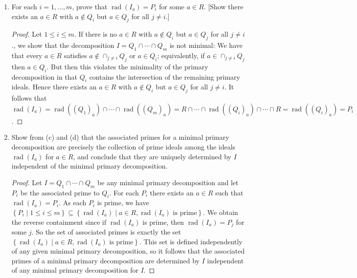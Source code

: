 \documentclass[11pt]{article}
\newcommand{\cbr}[1]{\left\{#1\right\}}
\DeclareMathOperator{\rad}{rad}
\begin{document}
\begin{enumerate}
\begin{enumerate}
\begin{proof}
        \end{proof}
        \item For each $i=1,\dots,m$, prove that $\rad(I_a)=P_i$ for some $a\in R$. [Show there exists an $a\in R$ with $a\not\in Q_i$ but $a\in Q_j$ for all $j\neq i$.] \begin{proof}
            Let $1\leq i\leq m$. If there is no $a\in R$ with $a\not\in Q_i$ but $a\in Q_j$ for all $j\neq i$., we show that the decomposition $I=Q_1\cap\cdots\cap Q_m$ is not minimal: We have that every $a\in R$ satisfies $a\not\in \cap_{j\neq i}Q_j$ or $a\in Q_i$; equivalently, if $a\in \cap_{j\neq i}Q_j$ then $a\in Q_i$. But then this violates the minimality of the primary decomposition in that $Q_i$ contains the intersection of the remaining primary ideals. Hence there exists an $a\in R$ with $a\not\in Q_i$ but $a\in Q_j$ for all $j\neq i$. It follows that $\rad (I_a) = \rad((Q_1)_a)\cap\cdots\cap \rad((Q_m)_a) = R\cap\cdots\cap \rad((Q_i)_a)\cap \cdots\cap R =  \rad((Q_i)_a) = P_i$.
        \end{proof}
        \item Show from (c) and (d) that the associated primes for a minimal primary decomposition are precisely the collection of prime ideals among the ideals $\rad(I_a)$ for $a\in R$, and conclude that they are uniquely determined by $I$ independent of the minimal primary decomposition. \begin{proof}
            Let $I=Q_1\cap\cdots\cap Q_m$ be any minimal primary decomposition and let $P_i$ be the associated prime to $Q_i$. For each $P_i$ there exists an $a\in R$ such that $\rad(I_a) = P_i$. As each $P_i$ is prime, we have $\cbr{P_i\mid 1\leq i \leq m}\subseteq \cbr{\rad(I_a)\mid a\in R, \rad(I_a)\text{ is prime}}$. We obtain the reverse containment since if $\rad(I_a)$ is prime, then $\rad(I_a) = P_j$ for some $j$. So the set of associated primes is exactly the set $\cbr{\rad(I_a)\mid a\in R, \rad(I_a)\text{ is prime}}$. This set is defined independently of any given minimal primary decomposition, so it follows that the associated primes of a minimal primary decomposition are determined by $I$ independent of any minimal primary decomposition for $I$.
        \end{proof}
    \end{enumerate}
\end{enumerate}
\end{document}
